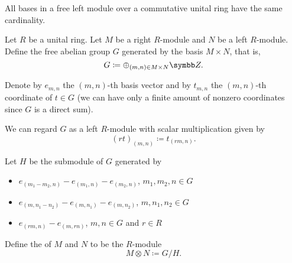 \begin{proposition}\label{thm:left_module_basis_cardinality}\cite{ProofWiki:bases_of_free_module_have_same_cardinality}
  All bases in a free left module over a commutative unital ring have the same cardinality.
\end{proposition}

\begin{definition}\label{def:module_tensor_product}\cite[574]{Knapp2016BAlg}
  Let \( R \) be a unital ring. Let \( M \) be a right \( R \)-module and \( N \) be a left \( R \)-module. Define the free abelian group \( G \) generated by the basis \( M \times N \), that is,
  \begin{equation*}
    G \coloneqq \oplus_{(m,n) \in M \times N} \BZ.
  \end{equation*}

  Denote by \( e_{m,n} \) the \( (m,n) \)-th basis vector and by \( t_{m,n} \) the \( (m,n) \)-th coordinate of \( t \in G \) (we can have only a finite amount of nonzero coordinates since \( G \) is a direct sum).

  We can regard \( G \) as a left \( R \)-module with scalar multiplication given by
  \begin{equation*}
    (r t)_{(m,n)} \coloneqq t_{(rm,n)}.
  \end{equation*}

  Let \( H \) be the submodule of \( G \) generated by
  \begin{itemize}
    \item \( e_{(m_1 - m_2, n)} - e_{(m_1,n)} - e_{(m_2,n)} \), \( m_1, m_2, n \in G \)
    \item \( e_{(m, n_1 - n_2)} - e_{(m,n_1)} - e_{(m,n_2)} \), \( m, n_1, n_2 \in G \)
    \item \( e_{(rm,n)} - e_{(m,rn)} \), \( m, n \in G \) and \( r \in R \)
  \end{itemize}

  Define the  of \( M \) and \( N \) to be the \( R \)-module 
  \begin{equation*}
    M \otimes N \coloneqq G / H.
  \end{equation*}
\end{definition}

